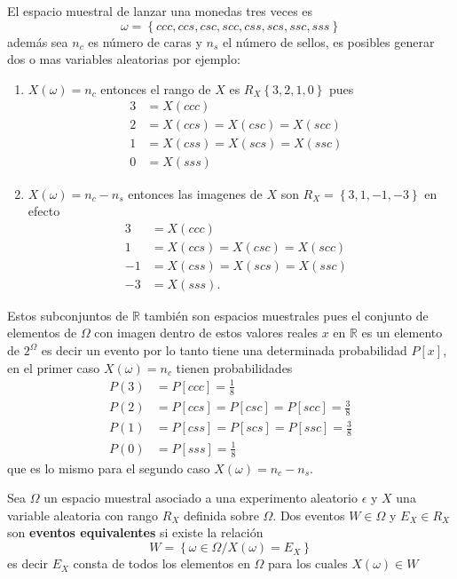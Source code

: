 \documentclass[10pt,]{krantz}
\providecommand{\tightlist}{%
  \setlength{\itemsep}{0pt}\setlength{\parskip}{0pt}}
\theoremstyle{definition}
\theoremstyle{definition}
\theoremstyle{definition}
\theoremstyle{remark}
\let\BeginKnitrBlock\begin \let\EndKnitrBlock\end
\begin{document}
\BeginKnitrBlock{example}
\protect\hypertarget{exm:unnamed-chunk-10}{}{\label{exm:unnamed-chunk-10} }El espacio muestral de lanzar una monedas tres veces es \[\omega= \left\{ccc,ccs,csc,scc,css,scs,ssc,sss\right\}\] además sea \(n_c\) es número de caras y \(n_s\) el número de sellos, es posibles generar dos o mas variables aleatorias por ejemplo:

\begin{enumerate}
\def\labelenumi{\arabic{enumi}.}
\tightlist
\item
  \(X(\omega)=n_c\) entonces el rango de \(X\) es \(R_X \left\{3,2,1,0\right\}\)
  pues \begin{align*}
    3&=X(ccc)&\\
    2&=X(ccs)=X(csc)=X(scc)&\\
    1&=X(css)=X(scs)=X(ssc)&\\
    0&=X(sss)&
  \end{align*}
\item
  \(X(\omega)=n_c-n_s\) entonces las imagenes de \(X\) son \(R_X= \left\{3,1,-1,-3\right\}\) en efecto
  \begin{align*}
    3&=X(ccc)&\\
    1&=X(ccs)=X(csc)=X(scc)&\\
    -1&=X(css)=X(scs)=X(ssc)&\\
    -3&=X(sss).&
  \end{align*}
\end{enumerate}

Estos subconjuntos de \(\mathbb{R}\) también son espacios muestrales pues el conjunto de elementos de \(\Omega\) con imagen dentro de estos valores reales \(x\) en \(\mathbb{R}\) es un elemento de \(2^{\Omega}\) es decir un evento por lo tanto tiene una determinada probabilidad \(P[x]\), en el primer caso \(X(\omega)=n_c\) tienen probabilidades\\
\begin{align*}
  P(3)&=P[ccc]= \frac{1}{8}\\
  P(2)&=P[ccs]=P[csc]=P[scc]=\frac{3}{8}\\
  P(1)&=P[css]=P[scs]=P[ssc]=\frac{3}{8}\\
  P(0)&=P[sss]=\frac{1}{8}
\end{align*}
que es lo mismo para el segundo caso \(X(\omega)=n_c-n_s\).
\EndKnitrBlock{example}

\BeginKnitrBlock{definition}[Eventos equivalentes]
\protect\hypertarget{def:unnamed-chunk-11}{}{\label{def:unnamed-chunk-11} \iffalse (Eventos equivalentes) \fi{} }Sea \(\Omega\) un espacio muestral asociado a una experimento aleatorio \(\epsilon\) y \(X\) una variable aleatoria con rango \(R_X\) definida sobre \(\Omega\). Dos eventos \(W\in\Omega\) y \(E_X\in R_X\) son \textbf{eventos equivalentes} si existe la relación
\[W= \left\{\omega\in\Omega/X(\omega)=E_X\right\}\] es decir \(E_X\) consta de todos los elementos en \(\Omega\) para los cuales \(X(\omega)\in W\)
\EndKnitrBlock{definition}
\end{document}
